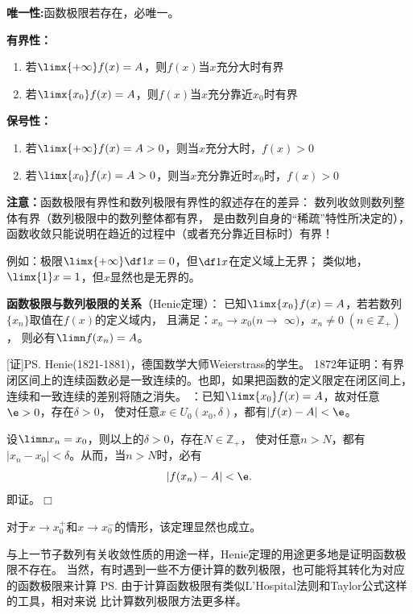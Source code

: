 \begin{thx}
	{\bf 唯一性:}函数极限若存在，必唯一。
	
	{\bf 有界性：}
	\begin{enumerate}[(1)]
	  \item 若$\limx{+\infty}f(x)=A$，则$f(x)$当$x$充分大时有界
	  \item 若$\limx{x_0}f(x)=A$，则$f(x)$当$x$充分靠近$x_0$时有界
	\end{enumerate}
	{\bf 保号性：}
	\begin{enumerate}[(1)]
	  \item 若$\limx{+\infty}f(x)=A>0$，则当$x$充分大时，$f(x)>0$
	  \item 若$\limx{x_0}f(x)=A>0$，则当$x$充分靠近时$x_0$时，$f(x)>0$
	\end{enumerate}
\end{thx}

{\bf 注意：}函数极限有界性和数列极限有界性的叙述存在的差异：
数列收敛则数列整体有界（数列极限中的数列整体都有界，
是由数列自身的“稀疏”特性所决定的），
函数收敛只能说明在趋近的过程中（或者充分靠近目标时）有界！

例如：极限$\limx{+\infty}\df1x=0$，但$\df1x$在定义域上无界；
类似地，$\limx{1}x=1$，但$x$显然也是无界的。

\begin{thx}
	{\bf 函数极限与数列极限的关系}（{\kaishu Henie定理}）：
	已知$\limx{x_0}f(x)=A$，若若数列$\{x_n\}$取值在$f(x)$的定义域内，
	且满足：$x_n\to x_0(n\to$ $\infty)$，$x_n\ne 0\;(n\in\mathbb{Z}_+)$，
	则必有$\limn f(x_n)=A$。
\end{thx}

[证]\ps{Henie(1821-1881)，德国数学大师Weierstrass的学生。
1872年证明：有界闭区间上的连续函数必是一致连续的。也即，如果把函数的定义限定在闭区间上，
连续和一致连续的差别将随之消失。} 
：已知$\limx{x_0}f(x)=A$，故对任意$\e>0$，存在$\delta>0$，
使对任意$x\in U_0(x_0,\delta)$，都有$|f(x)-A|<\e$。

设$\limn x_n=x_0$，则以上的$\delta>0$，存在$N\in\mathbb{Z}_+$，
使对任意$n>N$，都有$|x_n-x_0|<\delta$。从而，当$n>N$时，必有
$$|f(x_n)-A|<\e.$$
即证。\hfill $\Box$

对于$x\to x_0^+$和$x\to x_0^-$的情形，该定理显然也成立。

与上一节子数列有关收敛性质的用途一样，Henie定理的用途更多地是证明函数极限不存在。
当然，有时遇到一些不方便计算的数列极限，也可能将其转化为对应的函数极限来计算
\ps{由于计算函数极限有类似L'Hospital法则和Taylor公式这样的工具，相对来说
比计算数列极限方法更多样}。


